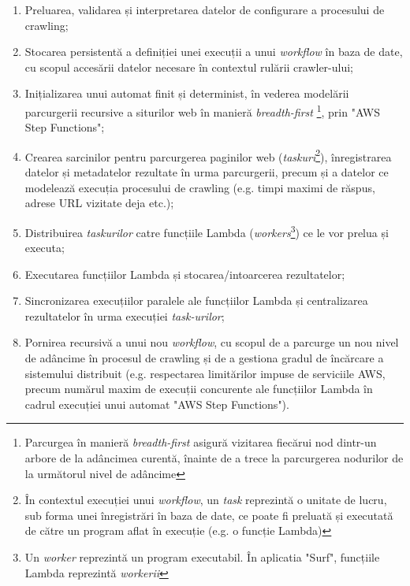 \begin{enumerate}

	\item{Preluarea, validarea și interpretarea datelor de configurare a procesului de crawling;}
	
	\item{Stocarea persistentă a definiției unei execuții a unui \textit{workflow} în baza de date, cu scopul accesării datelor necesare în contextul rulării crawler-ului;}
	
	\item{Inițializarea unui automat finit și determinist, în vederea modelării parcurgerii recursive a siturilor web în manieră \textit{breadth-first} \footnote{Parcurgea în manieră \textit{breadth-first} asigură vizitarea fiecărui nod dintr-un arbore de la adâncimea curentă, înainte de a trece la parcurgerea nodurilor de la următorul nivel de adâncime}, prin "AWS Step Functions";}
	
	\item{Crearea sarcinilor pentru parcurgerea paginilor web (\textit{taskuri}\footnote{În contextul execuției unui \textit{workflow}, un \textit{task} reprezintă o unitate de lucru, sub forma unei înregistrări în baza de date, ce poate fi preluată și executată de către un program aflat în execuție (e.g. o funcție Lambda)}), înregistrarea datelor și metadatelor rezultate în urma parcurgerii, precum și a datelor ce modelează execuția procesului de crawling (e.g. timpi maximi de răspus, adrese URL vizitate deja etc.);}
	
	\item{Distribuirea \textit{taskurilor} catre funcțiile Lambda (\textit{workers}\footnote{Un \textit{worker} reprezintă un program executabil. În aplicatia "Surf", funcțiile Lambda reprezintă \textit{workerii}}) ce le vor prelua și executa;}
	
	\item{Executarea funcțiilor Lambda și stocarea/intoarcerea rezultatelor;}
	
	\item{Sincronizarea execuțiilor paralele ale funcțiilor Lambda și centralizarea rezultatelor în urma execuției \textit{task-urilor};}
	
	\item{Pornirea recursivă a unui nou \textit{workflow}, cu scopul de a parcurge un nou nivel de adâncime în procesul de crawling și de a gestiona gradul de încărcare a sistemului distribuit (e.g. respectarea limitărilor impuse de serviciile AWS, precum numărul maxim de execuții concurente ale funcțiilor Lambda în cadrul execuției unui automat "AWS Step Functions").}
	
\end{enumerate} 

